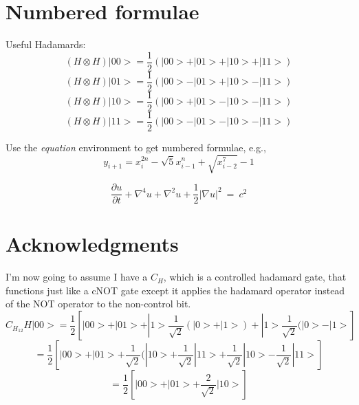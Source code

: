 \documentclass[12pt]{article}
\begin{document}
\section{Numbered formulae}

Useful Hadamards:
\begin{equation}
	(H\otimes H) |00> = \frac{1}{2}(|00> + |01> + |10> + |11>)
\end{equation}
\begin{equation}
	(H\otimes H) |01> = \frac{1}{2}(|00> - |01> + |10> - |11>)
\end{equation}
\begin{equation}
	(H\otimes H) |10> = \frac{1}{2}(|00> + |01> - |10> - |11>)
\end{equation}
\begin{equation}
	(H\otimes H) |11> = \frac{1}{2}(|00> - |01> - |10> - |11>)
\end{equation}

Use the \emph{equation} environment to get numbered formulae, e.g.,
\begin{equation}
	y_{i+1} = x_{i}^{2n} - \sqrt{5}x_{i-1}^{n} + \sqrt{x_{i-2}^7} -1
\end{equation}

\begin{equation}
	\frac{\partial u}{\partial t} + \nabla^{4}u + \nabla^{2}u +
        \frac12    |\nabla u|^{2}~ =~ c^2
\end{equation}

\section{Acknowledgments}

I'm now going to assume I have a $C_{H}$, which is a controlled hadamard gate, that functions just like a cNOT gate except it applies the hadamard operator instead of the NOT operator to the non-control bit.
$$C_{H_{12}}H|00> =  \frac{1}{2}[|00> + |01> + |1> \frac{1}{\sqrt{2}}(|0> + |1>) + |1>  \frac{1}{\sqrt{2}}(|0> - |1>]$$
$$ =  \frac{1}{2}[|00> + |01> +  \frac{1}{\sqrt{2}}(|10> +  \frac{1}{\sqrt{2}}|11> +  \frac{1}{\sqrt{2}}|10> -  \frac{1}{\sqrt{2}}|11>]$$
$$ =  \frac{1}{2}[|00> + |01> + \frac{2}{\sqrt{2}}|10>]$$
\end{document}
